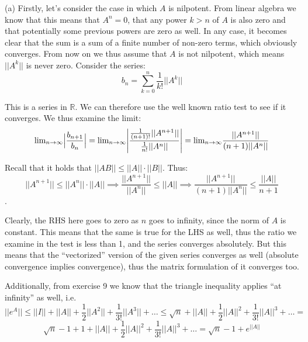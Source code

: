 \begin{solution}

    (a) Firstly, let's consider the case in which $A$ is nilpotent. From linear algebra we know that this means that $A^n = 0$, that any power $k>n$ of $A$ is also zero and that potentially some previous powers are zero as well. In any case, it becomes clear that the sum is a sum of a finite number of non-zero terms, which obviously converges. From now on we thus assume that $A$ is not nilpotent, which means $\lvert \lvert A^k \rvert \rvert$ is never zero. Consider the series:
    $$b_n = \sum_{k=0}^{n} \frac{1}{k!}\lvert \lvert A^k \rvert \rvert$$

    This is a series in $\mathbb{R}$. We can therefore use the well known ratio test to see if it converges. We thus examine the limit:
    $$\text{lim}_{n \rightarrow \infty} \Bigl\lvert \frac{b_{n+1}}{b_n} \Bigr\rvert = \text{lim}_{n \rightarrow \infty} \Biggl\lvert \frac{\frac{1}{(n+1)!}\lvert \lvert A^{n+1} \rvert \rvert} {\frac{1}{n!}\lvert \lvert A^n \rvert \rvert} \Biggr\rvert = \text{lim}_{n \rightarrow \infty} \frac{\lvert \lvert A^{n+1} \rvert \rvert}{(n+1)\lvert \lvert A^n \rvert \rvert}$$

    Recall that it holds that $\lvert \lvert AB \rvert \rvert \leq \lvert \lvert A \rvert \rvert \cdot \lvert \lvert B \rvert \rvert$. Thus:
    $$\lvert \lvert A^{n+1} \rvert \rvert \leq \lvert \lvert A^n \rvert \rvert \cdot \lvert \lvert A \rvert \rvert \implies \frac{\lvert \lvert A^{n+1} \rvert \rvert}{\lvert \lvert A^n \rvert \rvert} \leq \lvert \lvert A \rvert \rvert \implies \frac{\lvert \lvert A^{n+1} \rvert \rvert}{(n+1)\lvert \lvert A^n \rvert \rvert} \leq \frac{\lvert \lvert A \rvert \rvert}{n+1}$$.

    Clearly, the RHS here goes to zero as $n$ goes to infinity, since the norm of $A $ is constant. This means that the same is true for the LHS as well, thus the ratio we examine in the test is less than 1, and the series converges absolutely. But this means that the ``vectorized'' version of the given series converges as well (absolute convergence implies convergence), thus the matrix formulation of it converges too.

    Additionally, from exercise 9 we know that the triangle inequality applies ``at infinity'' as well, i.e.\:
    $$\lvert \lvert e^A \rvert \rvert \leq \lvert \lvert I \rvert \rvert + \lvert \lvert A \rvert \rvert + \frac{1}{2}\lvert \lvert A^2 \rvert \rvert + \frac{1}{3!}\lvert \lvert A^3 \rvert \rvert + \ldots \leq \sqrt{n} + \lvert \lvert A \rvert \rvert + \frac{1}{2}\lvert \lvert A \rvert \rvert^2 + \frac{1}{3!}\lvert \lvert A \rvert \rvert^3 + \ldots = $$
    $$\sqrt{n} - 1 + 1 + \lvert \lvert A \rvert \rvert + \frac{1}{2}\lvert \lvert A \rvert \rvert^2 + \frac{1}{3!}\lvert \lvert A \rvert \rvert^3 + \ldots = \sqrt{n} - 1 + e^{\lvert \lvert A \rvert \rvert}$$


\end{solution}
